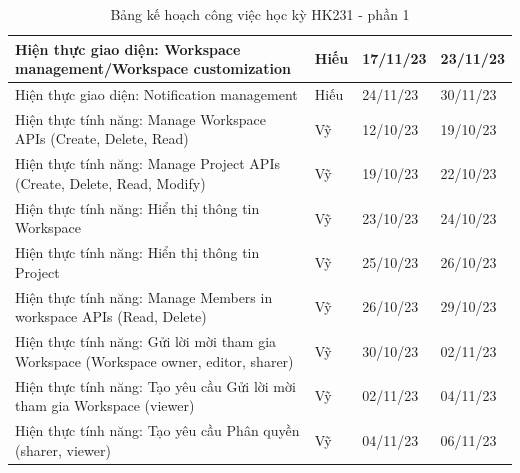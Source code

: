 \begin{table}[H]
{\begin{tabular}{|p{11cm}|p{1.75cm}|p{1.5cm}|p{1.5cm}|}
    Hiện thực giao diện: Workspace management/Workspace customization       & Hiếu     & 17/11/23 & 23/11/23 \\ \hline
    Hiện thực giao diện: Notification management                            & Hiếu     & 24/11/23 & 30/11/23 \\ \hline
    Hiện thực tính năng: Manage Workspace APIs (Create, Delete, Read)       & Vỹ       & 12/10/23 & 19/10/23 \\ \hline
    Hiện thực tính năng: Manage Project APIs (Create, Delete, Read, Modify) & Vỹ       & 19/10/23 & 22/10/23 \\ \hline
    Hiện thực tính năng: Hiển thị thông tin Workspace                       & Vỹ       & 23/10/23 & 24/10/23 \\ \hline
    Hiện thực tính năng: Hiển thị thông tin Project                         & Vỹ       & 25/10/23 & 26/10/23 \\ \hline
    Hiện thực tính năng: Manage Members in workspace APIs (Read, Delete)    & Vỹ       & 26/10/23 & 29/10/23 \\ \hline
    Hiện thực tính năng: Gửi lời mời tham gia Workspace (Workspace owner, editor, sharer) & Vỹ       & 30/10/23 & 02/11/23 \\ \hline
    Hiện thực tính năng: Tạo yêu cầu Gửi lời mời tham gia Workspace (viewer)              & Vỹ       & 02/11/23 & 04/11/23 \\ \hline
    Hiện thực tính năng: Tạo yêu cầu Phân quyền (sharer, viewer)            & Vỹ       & 04/11/23 & 06/11/23 \\ \hline
    \end{tabular}%
    }
    \caption{Bảng kế hoạch công việc học kỳ HK231 - phần 1}
\end{table}

